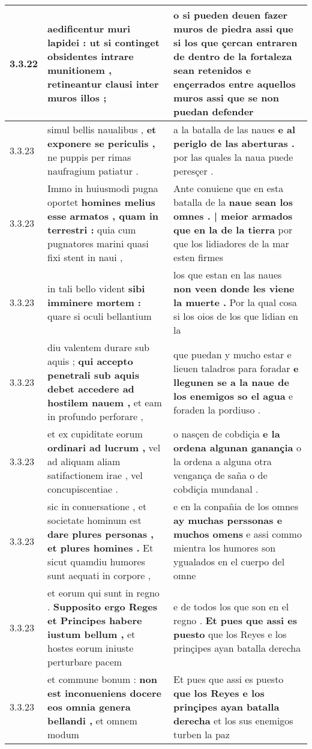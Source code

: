 \begin{tabular}{|p{1cm}|p{6.5cm}|p{6.5cm}|}
3.3.22 & aedificentur muri lapidei : \textbf{ ut si continget obsidentes intrare munitionem , } retineantur clausi inter muros illos ; & o si pueden deuen fazer muros de piedra \textbf{ assi que si los que çercan entraren de dentro de la fortaleza sean retenidos e ençerrados entre aquellos muros } assi que se non puedan defender \\\hline
3.3.23 & simul bellis naualibus , \textbf{ et exponere se periculis , } ne puppis per rimas naufragium patiatur . & a la batalla de las naues \textbf{ e al periglo de las aberturas . } por las quales la naua puede peresçer . \\\hline
3.3.23 & Immo in huiusmodi pugna oportet \textbf{ homines melius esse armatos , quam in terrestri : } quia cum pugnatores marini quasi fixi stent in naui , & Ante conuiene que en esta batalla de la \textbf{ naue sean los omnes . | meior armados que en la de la tierra } por que los lidiadores de la mar esten firmes \\\hline
3.3.23 & in tali bello vident \textbf{ sibi imminere mortem : } quare si oculi bellantium & los que estan en las naues \textbf{ non veen donde les viene la muerte . } Por la qual cosa si los oios de los que lidian en la \\\hline
3.3.23 & diu valentem durare sub aquis ; \textbf{ qui accepto penetrali sub aquis debet accedere ad hostilem nauem , } et eam in profundo perforare , & que puedan y mucho estar e lieuen taladros para foradar \textbf{ e llegunen se a la naue de los enemigos so el agua } e foraden la pordiuso . \\\hline
3.3.23 & et ex cupiditate eorum \textbf{ ordinari ad lucrum , } vel ad aliquam aliam satifactionem irae , vel concupiscentiae . & o nasçen de cobdiçia \textbf{ e la ordena algunan ganançia } o la ordena a alguna otra vengança de saña o de cobdiçia mundanal . \\\hline
3.3.23 & sic in conuersatione , et societate hominum est \textbf{ dare plures personas , et plures homines . } Et sicut quamdiu humores sunt aequati in corpore , & e en la conpañia de los omnes \textbf{ ay muchas perssonas e muchos omens } e assi commo mientra los humores son ygualados en el cuerpo del omne \\\hline
3.3.23 & et eorum qui sunt in regno . \textbf{ Supposito ergo Reges et Principes habere iustum bellum , } et hostes eorum iniuste perturbare pacem & e de todos los que son en el regno . \textbf{ Et pues que assi es puesto } que los Reyes e los prinçipes ayan batalla derecha \\\hline
3.3.23 & et commune bonum : \textbf{ non est inconueniens docere eos omnia genera bellandi , } et omnem modum & Et pues que assi es puesto \textbf{ que los Reyes e los prinçipes ayan batalla derecha } et los sus enemigos turben la paz \\\hline

\end{tabular}
